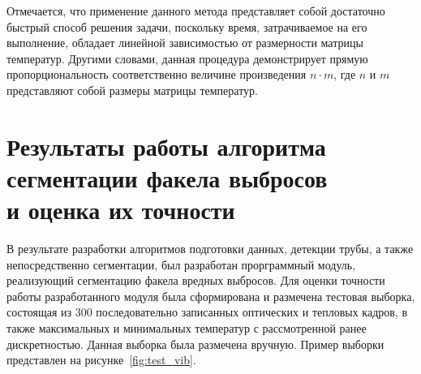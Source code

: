 \documentclass[14pt, a4paper]{extreport}
\begin{document}
	Отмечается, что применение данного метода представляет собой достаточно быстрый способ решения задачи, поскольку время, затрачиваемое на его выполнение, обладает линейной зависимостью от размерности матрицы температур. Другими словами, данная процедура демонстрирует прямую пропорциональность соответственно величине произведения $n \cdot m$, где $n$ и $m$ представляют собой размеры матрицы температур.
	
\section[\vspace*{-0.22cm}Результаты работы алгоритма сегментации факела выбросов\\ \hspace*{-0.75cm}и оценка их точности]{\vspace*{-0.22cm}Результаты работы алгоритма сегментации факела выбросов\\ \hspace*{-2.05cm}и оценка их точности}

	В результате разработки алгоритмов подготовки данных, детекции трубы, а также непосредственно сегментации, был разработан прорграммный модуль, реализующий сегментацию факела вредных выбросов. Для оценки точности работы разработанного модуля была сформирована и размечена тестовая выборка, состоящая из 300 последовательно записанных оптических и тепловых кадров, в также максимальных и минимальных температур с рассмотренной ранее дискретностью. Данная выборка была размечена вручную. Пример выборки представлен на рисунке~\ref{fig:test_vib}.
	
\end{document}
